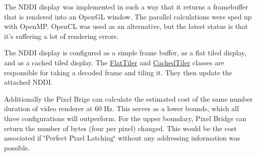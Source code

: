 The NDDI display was implemented in such a way that it returns a framebuffer that is rendered into an OpenGL window. The parallel calculations were sped up with OpenMP. OpenCL was used as an alternative, but the latest status is that it's suffering a lot of rendering errors.

The NDDI display is configured as a simple frame buffer, as a flat tiled display, and as a cached tiled display. The \hyperlink{class_flat_tiler}{FlatTiler} and \hyperlink{class_cached_tiler}{CachedTiler} classes are responsible for taking a decoded frame and tiling it. They then update the attached NDDI.

Additionally the Pixel Brige can calculate the estimated cost of the same number duration of video renderer at 60 Hz. This serves as a lower bounds, which all three configurations will outperform. For the upper boundary, Pixel Bridge can return the number of bytes (four per pixel) changed. This would be the cost associated if \char`\"{}Perfect Pixel Latching\char`\"{} without any addressing information was possible. 